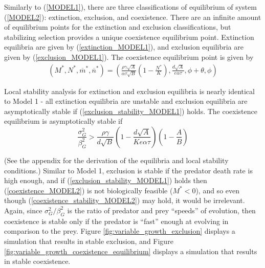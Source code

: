 \documentclass{amsart}
\theoremstyle{definition}
\theoremstyle{remark}
\numberwithin{equation}{section}
\begin{document}
Similarly to (\ref{MODEL1}), there are three classifications of equilibrium of system (\ref{MODEL2}): extinction, exclusion, and coexistence.  There are an infinite amount of equilibrium points for the extinction and exclusion classifications, but stabilizing selection provides a unique coexistence equilibrium point.  Extinction equilibria are given by (\ref{extinction_MODEL1}), and exclusion equilibria are given by (\ref{exclusion_MODEL1}).  The coexistence equilibrium point is given by
\begin{equation}
	\label{coexistence_MODEL2}
	\begin{aligned}
		(M^*, N^*, \overline{m}^*, \overline{n}^*) = \left(\frac{\rho\gamma\sqrt{A}}{\alpha\tau\sqrt{B}}\left(1 - \frac{N^*}{K}\right), \frac{d\sqrt{A}}{e\alpha\tau}, \phi + \theta, \phi\right)
	\end{aligned}
\end{equation}

Local stability analysis for extinction and exclusion equilibria is nearly identical to Model 1 - all extinction equilibria are unstable and exclusion equilibria are asymptotically stable if (\ref{exclusion_stability_MODEL1}) holds.  The coexistence equilibrium is asymptotically stable if
\begin{equation}
	\label{coexistence_stability_MODEL2}
	\frac{\sigma_G^2}{\beta_G^2} > \frac{\rho\gamma}{d\sqrt{B}}\left(1 - \frac{d\sqrt{A}}{Ke\alpha\tau}\right)\left(1 - \frac{A}{B}\right)
\end{equation}

(See the appendix for the derivation of the equilibria and local stability conditions.)  Similar to Model 1, exclusion is stable if the predator death rate is high enough, and if (\ref{exclusion_stability_MODEL1}) holds then (\ref{coexistence_MODEL2}) is not biologically feasible ($M^* < 0$), and so even though (\ref{coexistence_stability_MODEL2}) may hold, it would be irrelevant.  Again, since $\sigma_G^2/\beta_G^2$ is the ratio of predator and prey ``speeds'' of evolution, then coexistence is stable only if the predator is ``fast'' enough at evolving in comparison to the prey.  Figure \ref{fig:variable_growth_exclusion} displays a simulation that results in stable exclusion, and Figure \ref{fig:variable_growth_coexistence_equilibrium} displays a simulation that results in stable coexistence.
\end{document}
